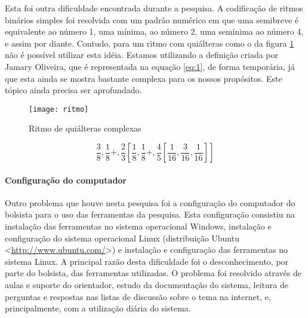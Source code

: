 \documentclass[11pt]{article}
\begin{document}
Esta foi outra dificuldade encontrada durante a pesquisa. A
codificação de ritmos binários simples foi resolvida com um padrão
numérico em que uma semibreve é equivalente ao número 1, uma mínima,
ao número 2, uma semínima ao número 4, e assim por diante. Contudo,
para um ritmo com quiálteras como o da figura \ref{fig:ritmocomp} não
é possível utilizar esta idéia. Estamos utilizando a definição criada
por Jamary Oliveira, que é representada na equação \ref{eq:1}, de
forma temporária, já que esta ainda se mostra bastante complexa para
os nossos propósitos. Este tópico ainda precisa ser aprofundado.

\begin{figure}
  \centering
  \texttt{[image: ritmo]}
  \caption{Ritmo de quiálteras complexas}
  \label{fig:ritmocomp}
\end{figure}

\begin{equation}
  \label{eq:1}
  \frac{3}{8},\frac{1}{8}+,\frac{2}{3}\left[\frac{1}{8},\frac{1}{8}+,\frac{4}{5}\left[\frac{1}{16},\frac{3}{16},\frac{1}{16}\right]\right]
\end{equation}

\paragraph{Configuração do computador}
\label{sec:conf-do-comp}

Outro problema que houve nesta pesquisa foi a configuração do
computador do bolsista para o uso das ferramentas da pesquisa. Esta
configuração consistiu na instalação das ferramentas no sistema
operacional Windows, instalação e configuração do sistema operacional
Linux (distribuição Ubuntu <\url{http://www.ubuntu.com/}>) e
instalação e configuração das ferramentas no sistema Linux. A
principal razão desta dificuldade foi o desconhecimento, por parte do
bolsista, das ferramentas utilizadas. O problema foi resolvido através
de aulas e suporte do orientador, estudo da documentação do sistema,
leitura de perguntas e respostas nas listas de discussão sobre o tema
na internet, e, principalmente, com a utilização diária do sistema.

\renewcommand{\refname}{Referências bibliográficas  (máximo 15)}

\nocite{ismir2003,ismir2002,ismir2001,ismir2000,kroger05:codificacao,doclilypond,docdarcs,stallman02:emacs}


\end{document}
